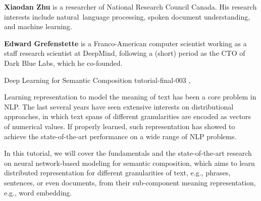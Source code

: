 \begin{bio}
  {\bfseries Xiaodan Zhu} is a researcher of National Research Council Canada.
  His research interests include natural language processing, spoken document
  understanding, and machine learning.

  {\bfseries Edward Grefenstette} is a Franco-American computer scientist
  working as a staff research scientist at DeepMind, following a (short) period
  as the CTO of Dark Blue Labs, which he co-founded.

\end{bio}

\begin{tutorial}
  {Deep Learning for Semantic Composition}
  {tutorial-final-003}
  {\daydateyear, \tutorialmorningtime}
  {\TutLocC}

Learning representation to model the meaning of text has been a core problem in
NLP. The last several years have seen extensive interests on distributional
approaches, in which text spans of different granularities are encoded as
vectors of numerical values. If properly learned, such representation has
showed to achieve the state-of-the-art performance on a wide range of NLP
problems.

In this tutorial, we will cover the fundamentals and the state-of-the-art
research on neural network-based modeling for semantic composition, which
aims to learn distributed representation for different granularities of text,
e.g., phrases, sentences, or even documents, from their sub-component meaning
representation, e.g., word embedding.

\end{tutorial}